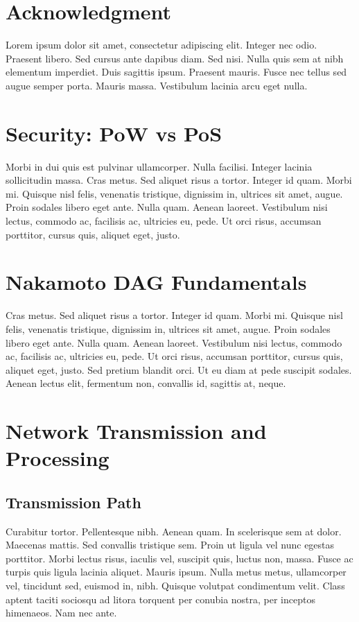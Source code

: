 \documentclass[peerreview]{ieeesyscoin}
\begin{document}
\appendices

\section*{Acknowledgment}
Lorem ipsum dolor sit amet, consectetur adipiscing elit. Integer nec odio. Praesent libero. Sed cursus ante dapibus diam. Sed nisi. Nulla quis sem at nibh elementum imperdiet. Duis sagittis ipsum. Praesent mauris. Fusce nec tellus sed augue semper porta. Mauris massa. Vestibulum lacinia arcu eget nulla. 


\section{Security: PoW vs PoS}

Morbi in dui quis est pulvinar ullamcorper. Nulla facilisi. Integer lacinia sollicitudin massa. Cras metus. Sed aliquet risus a tortor. Integer id quam. Morbi mi. Quisque nisl felis, venenatis tristique, dignissim in, ultrices sit amet, augue. Proin sodales libero eget ante. Nulla quam. Aenean laoreet. Vestibulum nisi lectus, commodo ac, facilisis ac, ultricies eu, pede. Ut orci risus, accumsan porttitor, cursus quis, aliquet eget, justo. 

\section{Nakamoto DAG Fundamentals}

Cras metus. Sed aliquet risus a tortor. Integer id quam. Morbi mi. Quisque nisl felis, venenatis tristique, dignissim in, ultrices sit amet, augue. Proin sodales libero eget ante. Nulla quam. Aenean laoreet. Vestibulum nisi lectus, commodo ac, facilisis ac, ultricies eu, pede. Ut orci risus, accumsan porttitor, cursus quis, aliquet eget, justo. Sed pretium blandit orci. Ut eu diam at pede suscipit sodales. Aenean lectus elit, fermentum non, convallis id, sagittis at, neque. 



\section{Network Transmission and Processing}

\subsection{Transmission Path}
Curabitur tortor. Pellentesque nibh. Aenean quam. In scelerisque sem at dolor. Maecenas mattis. Sed convallis tristique sem. Proin ut ligula vel nunc egestas porttitor. Morbi lectus risus, iaculis vel, suscipit quis, luctus non, massa. Fusce ac turpis quis ligula lacinia aliquet. Mauris ipsum. Nulla metus metus, ullamcorper vel, tincidunt sed, euismod in, nibh. Quisque volutpat condimentum velit. Class aptent taciti sociosqu ad litora torquent per conubia nostra, per inceptos himenaeos. Nam nec ante. 
\end{document}
